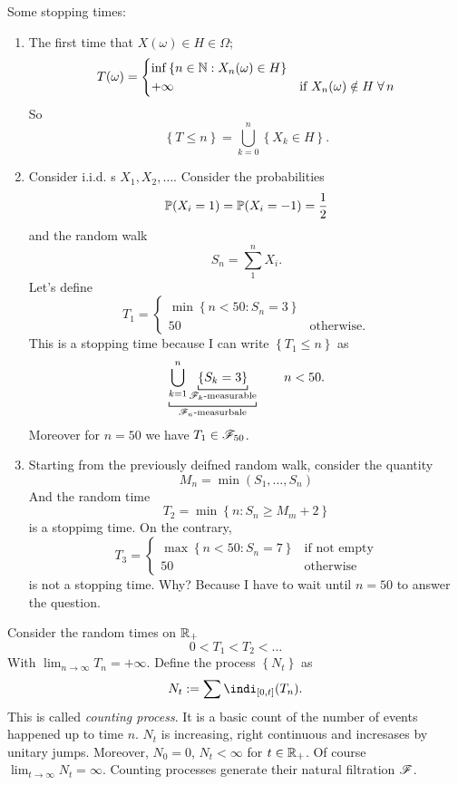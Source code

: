 \documentclass{report}
\begin{document}
\begin{example}
	Some stopping times:
	\begin{enumerate}[\circnum]
		\item The first time that $X(\omega)\in H\in\Omega$;
		\[T(\omega)=\begin{cases}
			\inf \left\{n\in\mathbb{N}:X_n(\omega)\in H\right\}&\\
			+\infty&\text{if $X_n(\omega)\notin H\;\forall\, n$}
		\end{cases}\]
		So
		\[\left\{T\leq n\right\}=\bigcup_{k=0}^{n}\left\{X_k\in H\right\}.\]
		\item Consider i.i.d. \rv{}s 
		$X_1,X_2,\ldots$. Consider the probabilities
		\[\mathbb{P}(X_i=1)=\mathbb{P}(X_i=-1)=\frac{1}{2}\]
		and the random walk
		\[S_n=\sum_{1}^{n}X_i.\]
		Let's define 
		\[T_1=\begin{cases}
			\min\left\{n<50:S_n=3\right\}\\
			50 &\text{otherwise}.
		\end{cases}\]
		This is a stopping time because I can write $\left\{T_1\leq n\right\}$ as $$\underbracket[0.6pt]{\bigcup_{k=1}^{n}\underbracket[0.6pt]{\left\{S_k=3\right\}}_{\text{$\F_k$-measurable}}}_{\mathclap{\text{$\F_n$-measurbale}}}\qquad n<50.$$
		Moreover for $n=50$ we have $T_{1}\in\mathscr{F}_{50}$.
		\item Starting from the previously deifned random walk, consider the quantity 
		\[M_n=\min(S_1,\ldots,S_n)\]
		And the random time
		\[T_2=\min\left\{n:S_n\geq M_m+2\right\}\]
		is a stoppimg time. On the contrary, 
		\[T_3=\begin{cases}
			\max\left\{n<50:S_n=7\right\}&\text{if not empty}\\
			50 &\text{otherwise}
		\end{cases}\]
		is not a stopping time. Why? Because I have to wait until $n=50$ to answer the question. 
	\end{enumerate}
\end{example}

Consider the random times on $\mathbb{R}_+$
\[0<T_1<T_2<\ldots\]
With $\lim_{n\to\infty}T_n=+\infty$. Define the process $\left\{N_t\right\}$ as 
\[N_t:=\sum\indi_{[0,t]}(T_n).\]
This is called \emph{counting process}. It is a basic count of the number of events happened up to time $n$.
$N_{t}$ is increasing, right continuous and incresases by unitary jumps. Moreover, $N_0=0$, $N_t<\infty$ for $t\in\mathbb{R}_+$. Of course $\lim_{t\to\infty}N_t=\infty$. Counting processes generate their natural filtration $\mathscr{F}$.
\end{document}
